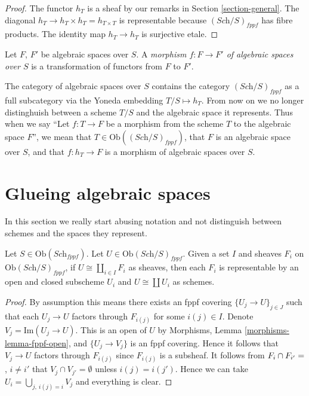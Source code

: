 \begin{proof}
The functor $h_T$ is a sheaf by our remarks in Section \ref{section-general}.
The diagonal $h_T \to h_T \times h_T = h_{T \times T}$ is
representable because $(\textit{Sch}/S)_{fppf}$ has fibre products.
The identity map $h_T \to h_T$ is surjective etale.
\end{proof}

\begin{definition}
\label{definition-morphism-algebraic-spaces}
Let $F$, $F'$ be algebraic spaces over $S$.
A {\it morphism $f : F \to F'$ of algebraic spaces over $S$}
is a transformation of functors from $F$ to $F'$.
\end{definition}

\noindent
The category of algebraic spaces over $S$ contains the category
$(\textit{Sch}/S)_{fppf}$ as a full subcategory via the
Yoneda embedding $T/S \mapsto h_T$. From now on we no longer distinghuish
between a scheme $T/S$ and the algebraic space it represents.
Thus when we say ``Let $f : T \to F$ be a morphism from the scheme
$T$ to the algebraic space $F$'', we mean that
$T \in \text{Ob}((\textit{Sch}/S)_{fppf})$, that $F$ is an
algebraic space over $S$, and that $f : h_T \to F$ is a morphism
of algebraic spaces over $S$.








\section{Glueing algebraic spaces}
\label{section-glueing-algebraic-spaces}

\noindent
In this section we really start abusing notation and not
distinguish between schemes and the spaces they represent.

\begin{lemma}
\label{lemma-representable-sheaf-coproduct-sheaves}
Let $S \in \text{Ob}(\textit{Sch}_{fppf})$.
Let $U \in \text{Ob}(\textit{Sch}/S)_{fppf}$.
Given a set $I$ and sheaves $F_i$ on $\text{Ob}(\textit{Sch}/S)_{fppf}$,
if $U \cong \coprod_{i\in I} F_i$
as sheaves, then each $F_i$ is representable by an open and closed
subscheme $U_i$ and $U \cong \coprod U_i$ as schemes.
\end{lemma}

\begin{proof}
By assumption this means there exists an fppf covering
$\{U_j \to U\}_{j \in J}$ such that each $U_j \to U$
factors through $F_{i(j)}$ for some $i(j) \in I$.
Denote $V_j = \text{Im}(U_j \to U)$.
This is an open of $U$ by
Morphisms, Lemma \ref{morphisms-lemma-fppf-open}, and
$\{U_j \to V_j\}$ is an fppf covering. Hence it follows that
$V_j \to U$ factors through $F_{i(j)}$ since $F_{i(j)}$ is
a subsheaf. It follows from $F_i \cap F_{i'} = \empty$, $i \not = i'$
that $V_j \cap V_{j'} = \emptyset$
unless $i(j) = i(j')$. Hence we can take
$U_i = \bigcup_{j,\ i(j) = i} V_j$ and everything is clear.
\end{proof}

